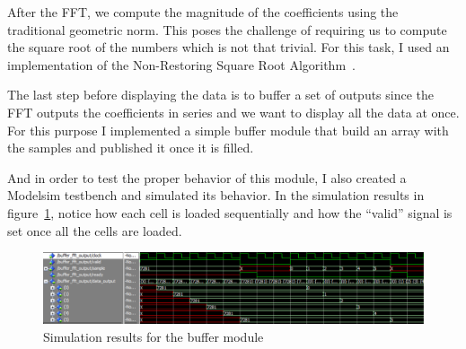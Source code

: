 \documentclass[letterpaper, titlepage, 11pt]{article}
\begin{document}
After the FFT, we compute the magnitude of the coefficients using the traditional geometric norm. This poses the challenge of requiring us to compute the square root of the numbers which is not that trivial. For this task, I used an implementation of the Non-Restoring Square Root Algorithm~\cite{sqrt}.




The last step before displaying the data is to buffer a set of outputs since the FFT outputs the coefficients in series and we want to display all the data at once. For this purpose I implemented a simple buffer module that build an array with the samples and published it once it is filled.



And in order to test the proper behavior of this module, I also created a Modelsim testbench and simulated its behavior. In the simulation results in figure~\ref{fig:buff_sim}, notice how each cell is loaded sequentially and how the ``valid'' signal is set once all the cells are loaded.



\begin{figure}[!htb]
  \centering
  \includegraphics[width=\textwidth]{buffer_sim.PNG}
  \caption{Simulation results for the buffer module}
  \label{fig:buff_sim}
\end{figure}
\end{document}
